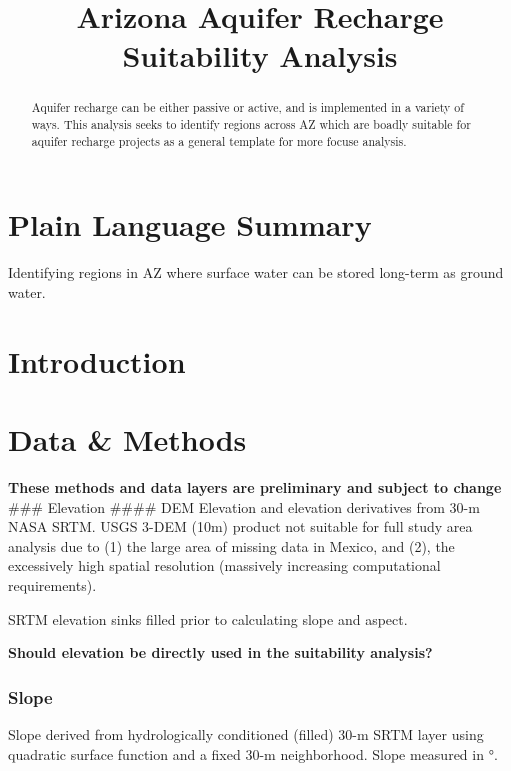 \documentclass[
]{agujournal2019}
\begin{document}
\title{Arizona Aquifer Recharge Suitability Analysis}



\begin{abstract}
Aquifer recharge can be either passive or active, and is implemented in
a variety of ways. This analysis seeks to identify regions across AZ
which are boadly suitable for aquifer recharge projects as a general
template for more focuse analysis.
\end{abstract}

\section*{Plain Language Summary}
Identifying regions in AZ where surface water can be stored long-term as
ground water.




\section{Introduction}\label{introduction}

\section{Data \& Methods}\label{sec-data-methods}

\textbf{These methods and data layers are preliminary and subject to
change} \#\#\# Elevation \#\#\#\# DEM Elevation and elevation
derivatives from 30-m NASA SRTM. USGS 3-DEM (10m) product not suitable
for full study area analysis due to (1) the large area of missing data
in Mexico, and (2), the excessively high spatial resolution (massively
increasing computational requirements).

SRTM elevation sinks filled prior to calculating slope and aspect.

\textbf{Should elevation be directly used in the suitability analysis?}

\subsubsection{Slope}\label{slope}

Slope derived from hydrologically conditioned (filled) 30-m SRTM layer
using quadratic surface function and a fixed 30-m neighborhood. Slope
measured in °.
\end{document}
